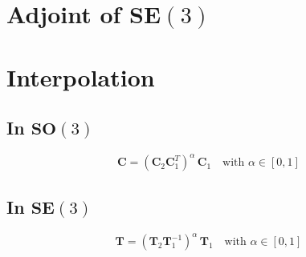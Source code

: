 \documentclass[12pt,landscape,a4paper]{article}
\newcommand{\SO}{\mathrm{\mathbf{SO}}}
\newcommand{\SE}{\mathrm{\mathbf{SE}}}
\newcommand{\C}{\mathbf{C}}
\newcommand{\T}{\mathbf{T}}
\begin{document}
\begin{multicols*}{3}
\section{Adjoint of $\SE(3)$}
\section{Interpolation}
	\subsection{In $\SO(3)$}
	$$\C = (\C_2\C_1^T)^\alpha\,\C_1 \quad\text{with } \alpha\in[0,1]$$
	\subsection{In $\SE(3)$}
	$$\T = (\T_2\T_1^{-1})^\alpha\,\T_1 \quad\text{with } \alpha\in[0,1]$$
\end{multicols*}
\end{document}
